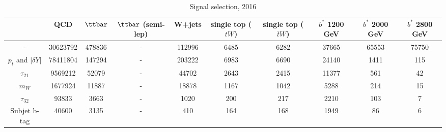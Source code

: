 \begin{table}[] 
\begin{tabular}{|c|ccccccccc|} 
\hline 
 &QCD	& $\ttbar$	& $\ttbar$ (semi-lep)	& W+jets	& single top ($tW$)	& single top ($\bar{t}W$)	& $b^{*}$ 1200 GeV	& $b^{*}$ 2000 GeV	& $b^{*}$ 2800 GeV	\\ 
\hline 
	-	& 30623792	& 478836	& - 	& 112996	& 6485	& 6282	& 37665	& 65553	& 75750	\\ 
	$p_{t}$ and $|\delta Y|$	& 78411804	& 147294	& - 	& 203222	& 6983	& 6690	& 24140	& 1411	& 115	\\ 
	$\tau_{21}$	& 9569212	& 52079	& - 	& 44702	& 2643	& 2415	& 11377	& 561	& 42	\\ 
	$m_{W}$	& 1677924	& 11887	& - 	& 18878	& 1167	& 1042	& 5288	& 214	& 15	\\ 
	$\tau_{32}$	& 93833	& 3663	& - 	& 1020	& 200	& 217	& 2210	& 103	& 7	\\ 
	Subjet b-tag	& 40600	& 3135	& - 	& 410	& 164	& 168	& 1949	& 86	& 6	\\ 
\hline 
\end{tabular} 
\caption{Signal selection, 2016} 
\end{table}